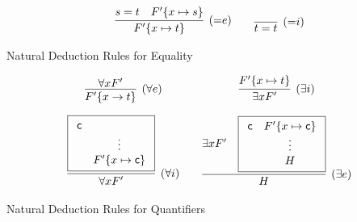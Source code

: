\begin{definition}
\begin{table}[hbt]
	\begin{gather*}
	\infer[({=}e)]{F'\{x\mapsto t\}}{s=t & F'\{x\mapsto s\}}
	\qquad
	\infer[({=}i)]{t=t}{}
	\end{gather*}
	\caption{Natural Deduction Rules for Equality}\label{tab:natural:deduction:equality}
\end{table}

\begin{table}[hbt]
	\begin{gather*}
	\begin{array}{ccc}
	\infer[(\forall e)]{F'\{x\to t\}}{
		\forall x F'
	}
	&&
		\infer[(\exists i)]{\exists x F'}{
		F'\{x\mapsto t \}
	}
	\\[1em]
	\infer[(\forall i)]{\forall x F'}{
		\boxed{
			\begin{array}{cc}
				\mc
				\\
				&\vdots
				\\
				&F' \{x\mapsto \mc\}
			\end{array}} %
	}
	&&
	\infer[(\exists e)]{H}{
		\exists x F' &
		\boxed{
			\begin{array}{cc}
				\mc&F' \{ x\mapsto \mc \}
				\\
				&\vdots
				\\
				&H
			\end{array}} %
	}
	\end{array}
	\end{gather*}
	\caption{Natural Deduction Rules for Quantifiers}\label{tab:natural:deduction:quantifiers}
\end{table}
\end{definition}